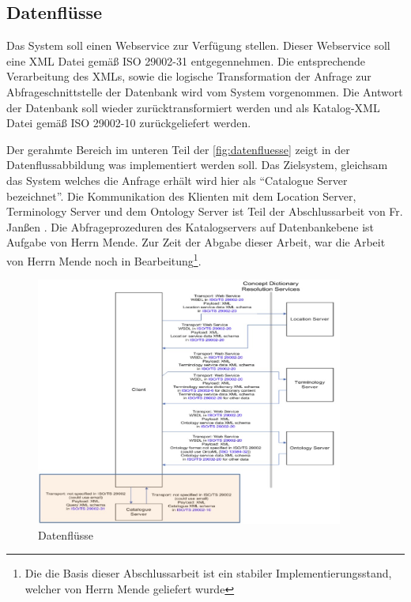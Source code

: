 \subsection{Datenflüsse}
Das System soll einen \gls{Webservice} zur Verfügung stellen. Dieser \gls{Webservice} soll eine XML Datei gemäß ISO 29002-31 entgegennehmen. Die entsprechende Verarbeitung des XMLs, sowie die logische Transformation der Anfrage zur Abfrageschnittstelle der Datenbank wird vom System vorgenommen. Die Antwort der Datenbank soll wieder zurücktransformiert werden und als Katalog-XML Datei gemäß ISO 29002-10 zurückgeliefert werden.
 
Der gerahmte Bereich im unteren Teil der \autoref{fig:datenfluesse} zeigt in der Datenflussabbildung was implementiert werden soll. Das Zielsystem, gleichsam das System welches die Anfrage erhält wird hier als \enquote{Catalogue Server bezeichnet}. 
Die Kommunikation des Klienten mit dem Location Server, Terminology Server und dem Ontology Server ist Teil der Abschlussarbeit von Fr. Janßen \citep[Vergl.][]{janssen}. 
Die Abfrageprozeduren des Katalogservers auf Datenbankebene ist Aufgabe von Herrn Mende. Zur Zeit der Abgabe dieser Arbeit, war die Arbeit von Herrn Mende noch in Bearbeitung\footnote{Die die Basis dieser Abschlussarbeit ist ein stabiler Implementierungsstand, welcher von Herrn Mende geliefert wurde}. 

\begin{figure}[htbp]
	\centering
		\includegraphics[width=0.90\textwidth]{images/datenfluesse_plib.jpg}
	\caption[Datenflüsse]{Datenflüsse\footnotemark}
	\label{fig:datenfluesse}
\end{figure}
